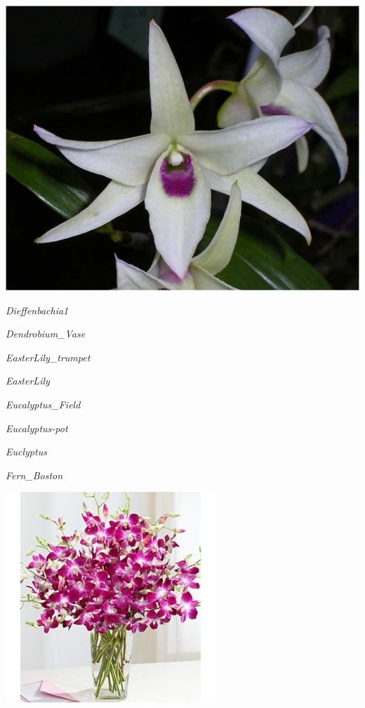 \documentclass{article}
\begin{document}
\begin{center}
\includegraphics[width=0.9\textheight, angle=90]{../Dendrobium_Flower.jpg}
\end{center}
\newpage

\noindent   
\vfill
\centerline{{\Large\emph{Dieffenbachia1}}}
\vfill
\newpage

\noindent   
\vfill
\centerline{{\Large\emph{Dendrobium_Vase}}}
\vfill
\newpage

\noindent   
\vfill
\centerline{{\Large\emph{EasterLily_trumpet}}}
\vfill
\newpage

\noindent   
\vfill
\centerline{{\Large\emph{EasterLily}}}
\vfill
\newpage

\noindent   
\vfill
\centerline{{\Large\emph{Eucalyptus_Field}}}
\vfill
\newpage

\noindent   
\vfill
\centerline{{\Large\emph{Eucalyptus-pot}}}
\vfill
\newpage

\noindent   
\vfill
\centerline{{\Large\emph{Euclyptus}}}
\vfill
\newpage

\noindent   
\vfill
\centerline{{\Large\emph{Fern_Boston}}}
\vfill
\newpage

\begin{center}
\includegraphics[width=0.9\textheight, angle=90]{../Dendrobium_Vase.jpg}
\end{center}
\newpage
\end{document}
